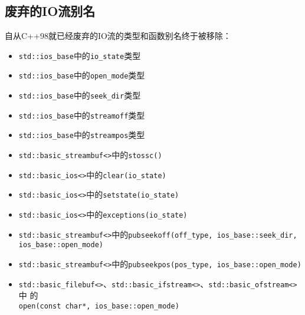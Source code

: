 \subsection{废弃的IO流别名}
自从C++98就已经废弃的IO流的类型和函数别名终于被移除：
\begin{itemize}
    \item \texttt{std::ios\_base}中的\texttt{io\_state}类型
    \item \texttt{std::ios\_base}中的\texttt{open\_mode}类型
    \item \texttt{std::ios\_base}中的\texttt{seek\_dir}类型
    \item \texttt{std::ios\_base}中的\texttt{streamoff}类型
    \item \texttt{std::ios\_base}中的\texttt{streampos}类型
    \item \texttt{std::basic\_streambuf<>}中的\texttt{stossc()}
    \item \texttt{std::basic\_ios<>}中的\texttt{clear(io\_state)}
    \item \texttt{std::basic\_ios<>}中的\texttt{setstate(io\_state)}
    \item \texttt{std::basic\_ios<>}中的\texttt{exceptions(io\_state)}
    \item \texttt{std::basic\_streambuf<>}中的\texttt{pubseekoff(off\_type, ios\_base::seek\_dir,\\
    ios\_base::open\_mode)}
    \item \texttt{std::basic\_streambuf<>}中的\texttt{pubseekpos(pos\_type, ios\_base::open\_mode)}
    \item \texttt{std::basic\_filebuf<>}、\texttt{std::basic\_ifstream<>}、\texttt{std::basic\_ofstream<>}中
    的\\
    \texttt{open(const char*, ios\_base::open\_mode)}
\end{itemize}

